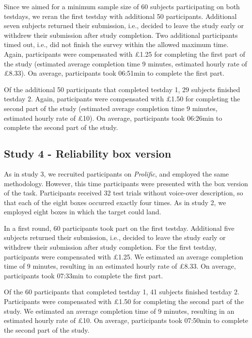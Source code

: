 \documentclass[
  man,floatsintext]{apa6}
\begin{document}
Since we aimed for a minimum sample size of 60 subjects participating on both testdays, we reran the first testday with additional 50 participants.
Additional seven subjects returned their submission, i.e., decided to leave the study early or withdrew their submission after study completion.
Two additional participants timed out, i.e., did not finish the survey within the allowed maximum time.
Again, participants were compensated with £1.25 for completing the first part of the study (estimated average completion time 9 minutes, estimated hourly rate of £8.33).
On average, participants took 06:51min to complete the first part.

Of the additional 50 participants that completed testday 1, 29 subjects finished testday 2.
Again, participants were compensated with £1.50 for completing the second part of the study (estimated average completion time 9 minutes, estimated hourly rate of £10).
On average, participants took 06:26min to complete the second part of the study.

\hypertarget{study-4---reliability-box-version}{%
\subsection{Study 4 - Reliability box version}\label{study-4---reliability-box-version}}

As in study 3, we recruited participants on \emph{Prolific}, and employed the same methodology.
However, this time participants were presented with the box version of the task.
Participants received 32 test trials without voice-over description, so that each of the eight boxes occurred exactly four times.
As in study 2, we employed eight boxes in which the target could land.

In a first round, 60 participants took part on the first testday.
Additional five subjects returned their submission, i.e., decided to leave the study early or withdrew their submission after study completion.
For the first testday, participants were compensated with £1.25.
We estimated an average completion time of 9 minutes, resulting in an estimated hourly rate of £8.33.
On average, participants took 07:33min to complete the first part.

Of the 60 participants that completed testday 1, 41 subjects finished testday 2.
Participants were compensated with £1.50 for completing the second part of the study.
We estimated an average completion time of 9 minutes, resulting in an estimated hourly rate of £10.
On average, participants took 07:50min to complete the second part of the study.
\end{document}
